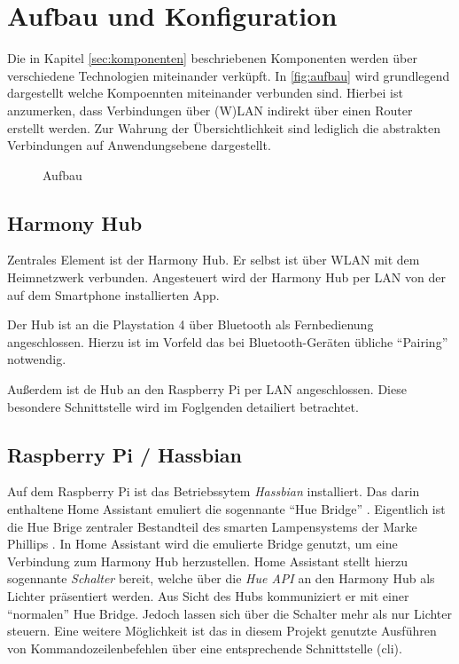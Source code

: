 \newpage
\section{Aufbau und Konfiguration}\label{sec:aufbau}
Die in Kapitel \ref{sec:komponenten} \textit{} beschriebenen Komponenten werden über verschiedene Technologien miteinander verküpft.
In \autoref{fig:aufbau} wird grundlegend dargestellt welche Kompoennten miteinander verbunden sind.
Hierbei ist anzumerken, dass Verbindungen über (W)LAN indirekt über einen Router erstellt werden.
Zur Wahrung der Übersichtlichkeit sind lediglich die abstrakten Verbindungen auf Anwendungsebene dargestellt.

\begin{figure}[ht!]
    \centering
    \resizebox{\textwidth}{!}{
        
    }
    \caption{Aufbau}
    \label{fig:aufbau}
\end{figure}

\subsection{Harmony Hub}\label{sec:aufbau-hub}
Zentrales Element ist der Harmony Hub.
Er selbst ist über WLAN mit dem Heimnetzwerk verbunden.
Angesteuert wird der Harmony Hub per LAN von der auf dem Smartphone installierten App.

Der Hub ist an die Playstation 4 über Bluetooth als Fernbedienung angeschlossen.
Hierzu ist im Vorfeld das bei Bluetooth-Geräten übliche \enquote{Pairing} notwendig.

Außerdem ist de Hub an den Raspberry Pi per LAN angeschlossen.
Diese besondere Schnittstelle wird im Foglgenden detailiert betrachtet.

\subsection{Raspberry Pi / Hassbian}\label{sec:aufbau-hassbian}
Auf dem Raspberry Pi ist das Betriebssytem \textit{Hassbian} installiert.
Das darin enthaltene Home Assistant emuliert die sogennante \enquote{Hue Bridge} \cite{Emulated83:online}.
Eigentlich ist die Hue Brige zentraler Bestandteil des smarten Lampensystems der Marke Phillips \cite{HueBridg65:online}.
In Home Assistant wird die emulierte Bridge genutzt, um eine Verbindung zum Harmony Hub herzustellen.
Home Assistant stellt hierzu sogennante \textit{Schalter} bereit, welche über die \textit{Hue API} an den Harmony Hub als Lichter präsentiert werden.
Aus Sicht des Hubs kommuniziert er mit einer \enquote{normalen} Hue Bridge.
Jedoch lassen sich über die Schalter mehr als nur Lichter steuern.
Eine weitere Möglichkeit ist das in diesem Projekt genutzte Ausführen von Kommandozeilenbefehlen über eine entsprechende Schnittstelle (\ac{cli}).

